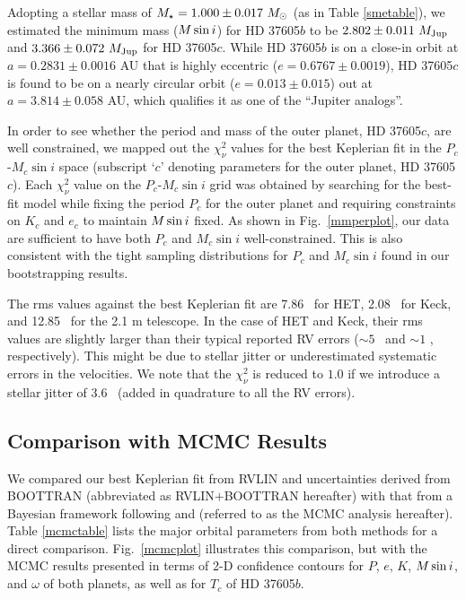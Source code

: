 Adopting a stellar mass of $M_\star=1.000 \pm 0.017\ M_{\odot}$ (as in Table
\ref{smetable}), we estimated the minimum mass ($M\sin{i}$) for HD
37605$b$ to be $2.802 \pm 0.011\ M_{\rm Jup}$ and $3.366 \pm 0.072\ M_{\rm Jup}$ for HD
37605$c$. While HD 37605$b$ is on a close-in orbit at $a=0.2831 \pm
0.0016$ AU that is highly eccentric ($e=0.6767 \pm 0.0019$), HD 37605$c$
is found to be on a nearly circular orbit ($e=0.013 \pm 0.015$) out at
$a=3.814 \pm 0.058$ AU, which qualifies it as one of the ``Jupiter
analogs''.

In order to see whether the period and mass of the outer planet, HD
37605$c$, are well constrained, we mapped out the $\chi_{\nu}^2$
values for the best Keplerian fit in the $P_c$-$M_c\sin{i}$ space
(subscript `$c$' denoting parameters for the outer planet, HD 37605$c$).
Each $\chi_{\nu}^2$ value on the $P_c$-$M_c\sin{i}$ grid was obtained
by searching for the best-fit model while fixing the period $P_c$ for the outer
planet and requiring constraints on $K_c$ and $e_c$ to maintain
$M\sin{i}$ fixed. As shown in Fig.~\ref{mmperplot}, our data are
sufficient to have both $P_c$ and $M_c\sin{i}$ well-constrained. This
is also consistent with the tight sampling distributions for $P_c$ and
$M_c\sin{i}$ found in our bootstrapping results.

The rms values against the best Keplerian fit are 7.86 \mps\ for HET,
2.08 \mps\ for Keck, and 12.85 \mps\ for the 2.1 m telescope. In the
case of HET and Keck, their rms values are slightly larger than their
typical reported RV errors ($\sim 5$ \mps\ and $\sim 1$ \mps,
respectively). This might be due to stellar jitter or underestimated
systematic errors in the velocities. We note that the $\chi_{\nu}^2$
is reduced to $1.0$ if we introduce a stellar jitter of 3.6 \mps\
(added in quadrature to all the RV errors).


\subsection{Comparison with MCMC Results}\label{SECN:MCMC}


We compared our best Keplerian fit from RVLIN and uncertainties
derived from BOOTTRAN (abbreviated as RVLIN$+$BOOTTRAN
hereafter) with that from a Bayesian framework following
\cite{Ford2005} and \cite{Ford2006} (referred to as the MCMC analysis
hereafter). Table \ref{mcmctable} lists the major orbital parameters
from both methods for a direct comparison. Fig.~\ref{mcmcplot}
illustrates this comparison, but with the MCMC results presented in
terms of 2-D confidence contours for $P$, $e$, $K$, $M\sin{i}$, and
$\omega$ of both planets, as well as for $T_c$ of HD 37605$b$.

